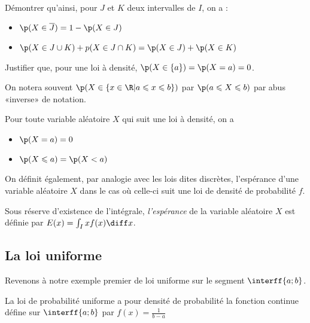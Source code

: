 \documentclass[11pt,a4paper,french]{article}
\begin{document}
\begin{remarque}
  \begin{exercice}~\\
    Démontrer qu'ainsi, pour $J$ et $K$ deux intervalles de $I$, on a :
    \begin{itemize}
      \item $\p(X\in \overline{J}) = 1 - \p(X\in J)$
      \item $\p(X\in J \cup K) + p(X\in J \cap K) = \p(X\in J) + \p(X\in K)$
    \end{itemize}
    Justifier que, pour une loi à densité, $\p(X \in \{a\}) = \p(X = a)
    = 0$.
  \end{exercice}
\end{remarque}

On notera souvent $\p(X\in \{x\in \R | a\leqslant x \leqslant b\})$ par
$\p(a \leqslant X \leqslant b)$ par abus «inverse» de notation.

\begin{propriete}
  Pour toute variable aléatoire $X$ qui suit une loi à densité, on a
  \begin{itemize}
    \item $\p(X = a) = 0$
    \item $\p(X \leqslant a ) = \p(X < a)$
  \end{itemize}
\end{propriete}

On définit également, par analogie avec les lois dites discrètes,
l'espérance d'une variable aléatoire $X$ dans le cas où celle-ci suit
une loi de densité de probabilité $f$.

\begin{definition}
  Sous réserve d'existence de l'intégrale, \emph{l'espérance} de la
  variable aléatoire $X$ est définie par $E(x) = \int_I xf(x) \diff x$.
\end{definition}

\subsection{La loi uniforme}

Revenons à notre exemple premier de loi uniforme sur le segment
$\interff{a;b}$.

\begin{definition}
  La loi de probabilité uniforme a pour densité de probabilité la
  fonction continue défine sur $\interff{a;b}$ par $f(x) = \frac1{b-a}$
\end{definition}
\end{document}
